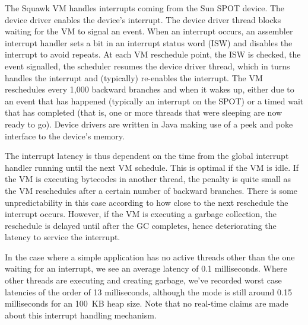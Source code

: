 \documentclass{sigplanconf}
\def\remark#1{\marginpar{\raggedright\hbadness=10000
        \def\baselinestretch{0.8}\scriptsize
        \it #1\par}}
\begin{document}
The Squawk VM handles interrupts coming from the Sun SPOT device. 
The device driver enables the device's interrupt.
The device driver thread blocks waiting for the VM to signal 
an event. 
When an interrupt occurs, an assembler interrupt handler sets 
a bit in an interrupt status word (ISW) and disables the 
interrupt to avoid repeats. 
At each VM reschedule point, the ISW is checked, the event 
signalled, the scheduler resumes the device driver thread, 
which in turns handles the interrupt and (typically) re-enables 
the interrupt. 
The VM reschedules every 1,000 backward branches and when it 
wakes up, either due to an event that has happened (typically
an interrupt on the SPOT) or a timed wait that has completed 
(that is, one or more threads that were sleeping are now ready
to go).
Device drivers are written in Java making use of a peek and poke
interface to the device's memory. 

The interrupt latency is thus dependent on the time from the global interrupt 
handler running until the next VM schedule. 
This is optimal if the VM is idle.  
If the VM is executing bytecodes in another thread, the penalty is 
quite small as the VM reschedules after a certain number of backward 
branches.  There is some unpredictability in this case according to 
how close to the next reschedule the interrupt occurs.
However, if the VM is executing a garbage collection, the reschedule 
is delayed until after the GC completes, hence deteriorating the 
latency to service the interrupt.  


In the case where a simple application has no active threads other than the
one waiting for an interrupt, we see an average latency of 0.1
milliseconds.  Where other threads are executing and creating garbage,
we've recorded worst case latencies of the order of 13 milliseconds,
although the mode is still around 0.15 milliseconds for an 100~KB heap size. 
Note that no real-time claims are made about this interrupt handling mechanism.
\end{document}
